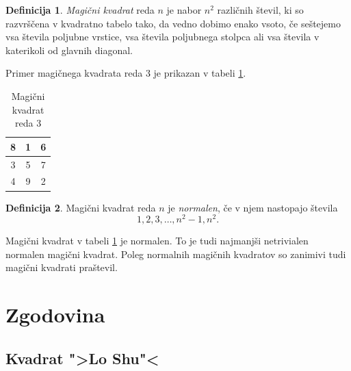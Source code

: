 \documentclass[a4paper,12pt]{article}
\theoremstyle{definition}
\newtheorem{definicija}{Definicija}
\theoremstyle{plain}
\begin{document}
\begin{definicija}
   \emph{Magični kvadrat} reda $n$ je nabor $n^2$ različnih števil,
   ki so razvrščena v kvadratno tabelo tako, da vedno dobimo enako vsoto,
   če seštejemo vsa števila poljubne vrstice, vsa števila poljubnega
   stolpca ali vsa števila v katerikoli od glavnih diagonal.
\end{definicija}

Primer magičnega kvadrata reda 3 je prikazan v tabeli \ref{table.mag3}.

\begin{table}[!ht]
   \caption{Magični kvadrat reda 3}
   \label{table.mag3}
   \centering
   \large
   \begin{tabular}{|c|c|c|}
      \hline
      8 & 1 & 6 \\\hline
      3 & 5 & 7 \\\hline
      4 & 9 & 2 \\\hline   
   \end{tabular}
\end{table}

\begin{definicija}

   Magični kvadrat reda $n$ je \emph{normalen}, če v njem nastopajo števila
   \begin{equation}
      \label{eq:numbers}
      1, 2, 3, \ldots, n^2-1, n^2.
   \end{equation}
\end{definicija}

Magični kvadrat v tabeli \ref{table.mag3} je normalen.
To je tudi najmanjši netrivialen normalen magični kvadrat.
Poleg normalnih magičnih kvadratov so zanimivi tudi magični kvadrati praštevil.


\section{Zgodovina}

\subsection{Kvadrat ">Lo Shu"<}
\end{document}
